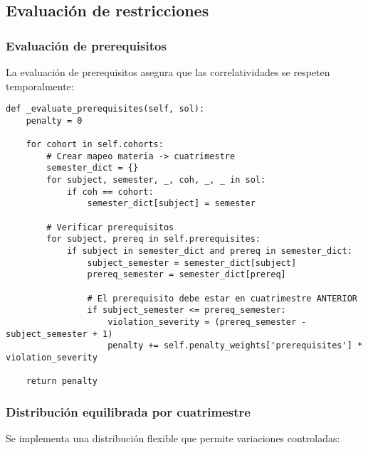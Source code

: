 \subsection{Evaluación de restricciones}

\subsubsection{Evaluación de prerequisitos}
La evaluación de prerequisitos asegura que las correlatividades se respeten temporalmente:

\begin{verbatim}
def _evaluate_prerequisites(self, sol):
    penalty = 0
    
    for cohort in self.cohorts:
        # Crear mapeo materia -> cuatrimestre
        semester_dict = {}
        for subject, semester, _, coh, _, _ in sol:
            if coh == cohort:
                semester_dict[subject] = semester
        
        # Verificar prerequisitos
        for subject, prereq in self.prerequisites:
            if subject in semester_dict and prereq in semester_dict:
                subject_semester = semester_dict[subject]
                prereq_semester = semester_dict[prereq]
                
                # El prerequisito debe estar en cuatrimestre ANTERIOR
                if subject_semester <= prereq_semester:
                    violation_severity = (prereq_semester - subject_semester + 1)
                    penalty += self.penalty_weights['prerequisites'] * violation_severity
    
    return penalty
\end{verbatim}

\subsubsection{Distribución equilibrada por cuatrimestre}
Se implementa una distribución flexible que permite variaciones controladas:

